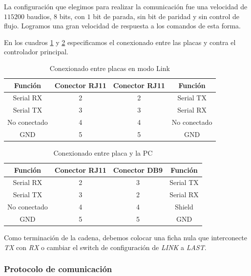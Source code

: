 La configuraci\'on que elegimos para realizar la comunicaci\'on fue una velocidad de $115200$ baudios, $8$ bits, con $1$
bit de parada, sin bit de paridad y sin control de flujo.
Logramos una gran velocidad de respuesta a los comandos de esta forma.

En los cuadros \ref{hT_comm_conexionLink} y \ref{hT_comm_conexionRS232} especificamos el conexionado entre las placas
y contra el controlador principal.

\begin{table}[ht]
	\begin{center}
		\begin{tabular}{|c|c|c|c|}
			\hline
			Funci\'on & Conector RJ11 & Conector RJ11 & Funci\'on\\
			\hline
			Serial RX & 2 & 2 & Serial TX \\
			\hline
			Serial TX & 3 & 3 & Serial RX \\
			\hline
			No conectado & 4 & 4 & No conectado \\
			\hline
			GND & 5 & 5 &  GND\\
			\hline
		\end{tabular}
		\caption{Conexionado entre placas en modo Link}
		\label{hT_comm_conexionLink}
	\end{center}
\end{table}

\begin{table}[ht]
	\begin{center}
		\begin{tabular}{|c|c|c|c|}
			\hline
			Funci\'on & Conector RJ11 & Conector DB9 & Funci\'on\\
			\hline
			Serial RX & 2 & 3 & Serial TX \\
			\hline
			Serial TX & 3 & 2 & Serial RX \\
			\hline
			No conectado & 4 & 4 & Shield \\
			\hline
			GND & 5 & 5 &  GND\\
			\hline
		\end{tabular}
		\caption{Conexionado entre placa y la PC}
		\label{hT_comm_conexionRS232}
	\end{center}
\end{table}

Como terminaci\'on de la cadena, debemos colocar una ficha nula que interconecte \emph{TX} con \emph{RX} o
cambiar el switch de configuraci\'on de \emph{LINK} a \emph{LAST}.

\subsubsection{Protocolo de comunicaci\'on}
\label{h_comm_protocolo}

